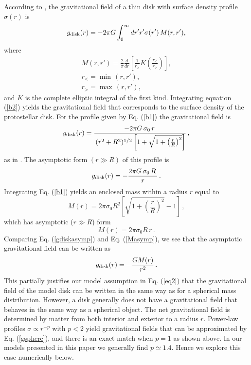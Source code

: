 \documentclass[twocolumn,linenumbers]{aastex631}
\begin{document}
 According to \citet{toomre1963}, the gravitational field of a thin disk with surface density profile $\sigma(r)$ is
\begin{equation}
g_{\rm disk}(r) = -2\pi G \int_0^\infty dr'r'\sigma(r')\,M(r,r'),
\label{b2}
\end{equation}
where
\begin{align}
M(r, r') = \frac{2}{\pi} \frac{d}{dr}\left[\frac{1}{r_>} K\left(\frac{r_<}{r_>}\right) \right],\nonumber\\
r_< = \min \, (r, r'), \nonumber\\
r_> = \max \,(r,r'),\nonumber
\label{b3}
\end{align}
and $K$ is the complete elliptic integral of the first kind. Integrating equation (\ref{b2}) yields the gravitational field that corresponds to the surface density of the protostellar disk. For the profile given by Eq. (\ref{b1}) the gravitational field is \\
\begin{equation}
g_{\rm disk}(r) = \frac{-2 \pi G \, \sigma_0 \, r \,} {\, (r^2 + R^2)^{1/2} \left[ 1 + \sqrt{1 + \left( \frac{r}{R} \right)^2}\right]}\, ,
\end{equation}
as in \cite{basu1997}. The asymptotic form $(r \gg R)$ of this profile is 
\begin{equation}
   g_{\rm disk}(r) = -  \frac{2 \pi G \, \sigma_0 \, R \,}{r} \, .
   \label{gdiskasymp}
\end{equation}
Integrating Eq. (\ref{b1}) yields an enclosed mass within a radius $r$ equal to 
\begin{equation}
    M(r) = 2 \pi \sigma_0 R^2 \left[ \sqrt{1 + \left( \frac{r}{R} \right)^2} - 1\right] \, ,
\end{equation}
which has asymptotic ($r \gg R$) form
\begin{equation}
    M(r) =  2 \pi \sigma_0 R \, r \, .
    \label{Masymp}
\end{equation}
Comparing Eq. (\ref{gdiskasymp}) and Eq. (\ref{Masymp}), we see that the asymptotic gravitational field can be written as 
\begin{equation}
    g_{\rm disk}(r) = - \frac{GM(r)}{r^2} \, .
    \label{gsphere}
\end{equation}
This partially justifies our model assumption in Eq. (\ref{eq2}) that the gravitational field of the model disk can be written in the same way as for a spherical mass distribution. However, a disk generally does not have a gravitational field that behaves in the same way as a spherical object. The net gravitational field is determined by matter from both interior and exterior to a radius $r$. Power-law profiles $\sigma \propto r^{-p}$ with $p<2$ yield gravitational fields that can be approximated by Eq. (\ref{gsphere}), and there is an exact match when $p=1$ as shown above. In our models presented in this paper we generally find $p \simeq 1.4$. Hence we explore this case numerically below.
\end{document}
